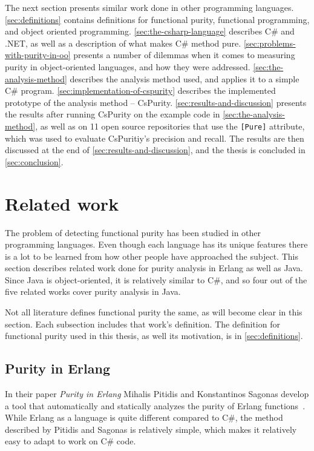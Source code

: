 \documentclass[a4paper,12pt]{article}
\newcommand{\Autoref}[1]{%
  \begingroup%
  \def\chapterautorefname{Chapter}%
  \def\sectionautorefname{Section}%
  \def\subsectionautorefname{Subsection}%
  \def\itemautorefname{Item}%
  \autoref{#1}%
  \endgroup%
}
\begin{document}
 The next section presents similar work done in other programming languages. \Autoref{sec:definitions} contains definitions for functional purity, functional programming, and object oriented programming. \Autoref{sec:the-csharp-language} describes C\# and .NET, as well as a description of what makes C\# method pure. \Autoref{sec:problems-with-purity-in-oo} presents a number of dilemmas when it comes to measuring purity in object-oriented languages, and how they were addressed. \Autoref{sec:the-analysis-method} describes the analysis method used, and applies it to a simple C\# program. \Autoref{sec:implementation-of-cspurity} describes the implemented prototype of the analysis method -- CsPurity. \Autoref{sec:results-and-discussion} presents the results after running CsPurity on the example code in \autoref{sec:the-analysis-method}, as well as on 11 open source repositories that use the \texttt{[Pure]} attribute, which was used to evaluate CsPuritiy's precision and recall. The results are then discussed at the end of \autoref{sec:results-and-discussion}, and the thesis is concluded in \autoref{sec:conclusion}.

\section{Related work} \label{sec:related-work} %

The problem of detecting functional purity has been studied in other programming languages. Even though each language has its unique features there is a lot to be learned from how other people have approached the subject. This section describes related work done for purity analysis in Erlang as well as Java. Since Java is object-oriented, it is relatively similar to C\#, and so four out of the five related works cover purity analysis in Java.

Not all literature defines functional purity the same, as will become clear in this section. Each subsection includes that work's definition. The definition for functional purity used in this thesis, as well its motivation, is in \autoref{sec:definitions}.

\subsection{Purity in Erlang} \label{sub:Purity-in-Erlang}

In their paper \textit{Purity in Erlang} Mihalis Pitidis and Konstantinos Sagonas develop a tool that automatically and statically analyzes the purity of Erlang functions~\cite{pitidis2010purity}. While Erlang as a language is quite different compared to C\#, the method described by Pitidis and Sagonas is relatively simple, which makes it relatively easy to adapt to work on C\# code. %
\end{document}
